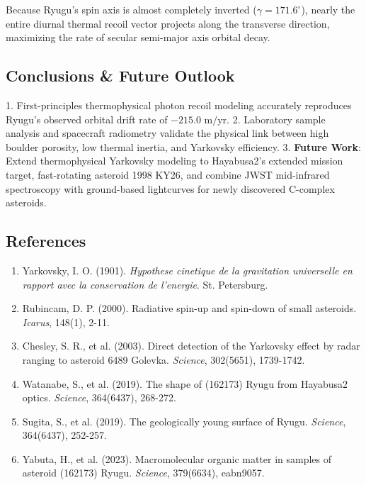 \documentclass[11pt,a4paper]{article}
\begin{document}
Because Ryugu's spin axis is almost completely inverted ($\gamma = 171.6^\circ$), nearly the entire diurnal thermal recoil vector projects along the transverse direction, maximizing the rate of secular semi-major axis orbital decay.

\subsection{Conclusions \& Future Outlook}
1. First-principles thermophysical photon recoil modeling accurately reproduces Ryugu's observed orbital drift rate of $-215.0\text{ m/yr}$.
2. Laboratory sample analysis and spacecraft radiometry validate the physical link between high boulder porosity, low thermal inertia, and Yarkovsky efficiency.
3. \textbf{Future Work}: Extend thermophysical Yarkovsky modeling to Hayabusa2's extended mission target, fast-rotating asteroid 1998 KY26, and combine JWST mid-infrared spectroscopy with ground-based lightcurves for newly discovered C-complex asteroids.

\subsection*{References}
\begin{enumerate}
    \item Yarkovsky, I. O. (1901). \textit{Hypothese cinetique de la gravitation universelle en rapport avec la conservation de l'energie}. St. Petersburg.
    \item Rubincam, D. P. (2000). Radiative spin-up and spin-down of small asteroids. \textit{Icarus}, 148(1), 2-11.
    \item Chesley, S. R., et al. (2003). Direct detection of the Yarkovsky effect by radar ranging to asteroid 6489 Golevka. \textit{Science}, 302(5651), 1739-1742.
    \item Watanabe, S., et al. (2019). The shape of (162173) Ryugu from Hayabusa2 optics. \textit{Science}, 364(6437), 268-272.
    \item Sugita, S., et al. (2019). The geologically young surface of Ryugu. \textit{Science}, 364(6437), 252-257.
    \item Yabuta, H., et al. (2023). Macromolecular organic matter in samples of asteroid (162173) Ryugu. \textit{Science}, 379(6634), eabn9057.
\end{enumerate}

\newpage

\end{document}
